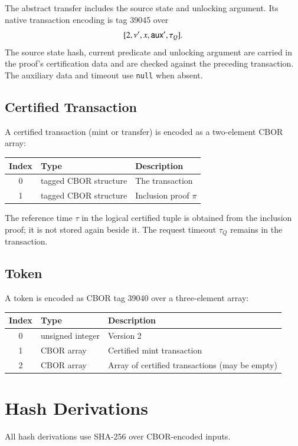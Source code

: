 The abstract transfer includes the source state and unlocking argument. Its native transaction encoding is tag 39045 over
\[
[2,\nu',x,\mathsf{aux}',\tau_Q].
\]
The source state hash, current predicate and unlocking argument are carried in the proof's certification data and are checked against the preceding transaction. The auxiliary data and timeout use \texttt{null} when absent.


\subsection{Certified Transaction}

A certified transaction (mint or transfer) is encoded as a two-element CBOR array:

\begin{longtable}{clp{8cm}}
\textbf{Index} & \textbf{Type} & \textbf{Description} \\
\hline
0 & tagged CBOR structure & The transaction \\
1 & tagged CBOR structure & Inclusion proof $\pi$ \\
\end{longtable}

The reference time $\tau$ in the logical certified tuple is obtained from the inclusion proof; it is not stored again beside it. The request timeout $\tau_Q$ remains in the transaction.


\subsection{Token}

A token is encoded as CBOR tag 39040 over a three-element array:

\begin{longtable}{clp{8cm}}
\textbf{Index} & \textbf{Type} & \textbf{Description} \\
\hline
0 & unsigned integer & Version 2 \\
1 & CBOR array & Certified mint transaction \\
2 & CBOR array & Array of certified transactions (may be empty) \\
\end{longtable}


\section{Hash Derivations}\label{app:hash-derivations}

All hash derivations use SHA-256 over CBOR-encoded inputs.

